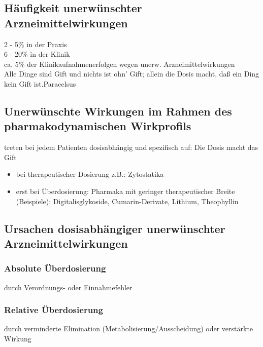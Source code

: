 \documentclass[10pt,a4paper]{report}
\begin{document}
\subsection{Häufigkeit unerwünschter Arzneimittelwirkungen}
2 - 5\% in der Praxis 		\\
6 - 20\% in der Klinik\\
ca. 5\% der Klinikaufnahmenerfolgen wegen unerw. Arzneimittelwirkungen\\
\glqq Alle Dinge sind Gift und nichts ist ohn’ Gift; allein die Dosis macht, daß ein Ding kein Gift ist.Paracelsus\grqq
\subsection{Unerwünschte Wirkungen im Rahmen des
pharmakodynamischen Wirkprofils}
treten bei jedem Patienten dosisabhängig und spezifisch auf: \glqq Die Dosis macht das Gift\grqq
\begin{itemize}
	\item bei therapeutischer Dosierung   z.B.: Zytostatika
	\item erst bei Überdosierung: Pharmaka mit geringer therapeutischer Breite (Beispiele):	Digitalisglykoside, Cumarin-Derivate, Lithium, Theophyllin
\end{itemize}
\subsection{Ursachen dosisabhängiger unerwünschter Arzneimittelwirkungen}
\subsubsection{Absolute Überdosierung} durch Verordnungs- oder Einnahmefehler
\subsubsection{Relative Überdosierung} durch verminderte Elimination (Metabolisierung/Ausscheidung) oder verstärkte Wirkung
\end{document}
